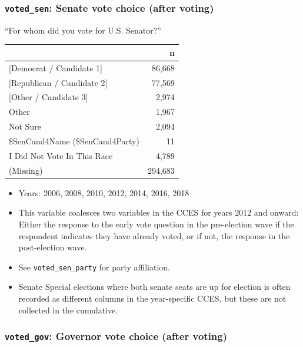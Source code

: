 \documentclass[10pt,article,oneside]{memoir}
\theoremstyle{definition}
\begin{document}
\hypertarget{voted_sen-senate-vote-choice-after-voting}{%
\subsubsection{\texorpdfstring{\texttt{voted\_sen}: Senate vote choice
(after
voting)}{voted\_sen: Senate vote choice (after voting)}}\label{voted_sen-senate-vote-choice-after-voting}}

``For whom did you vote for U.S. Senator?''

\begin{table}[H]
\centering
\begin{tabular}{lr}
\toprule
 & n\\
\midrule
{[Democrat / Candidate 1]} & 86,668\\
{[Republican / Candidate 2]} & 77,569\\
{[Other / Candidate 3]} & 2,974\\
Other & 1,967\\
Not Sure & 2,094\\
\$SenCand4Name (\$SenCand4Party) & 11\\
I Did Not Vote In This Race & 4,789\\
(Missing) & 294,683\\
\bottomrule
\end{tabular}
\end{table}

\begin{itemize}
\tightlist
\item
  Years: 2006, 2008, 2010, 2012, 2014, 2016, 2018
\item
  This variable coalesces two variables in the CCES for years 2012 and
  onward: Either the response to the early vote question in the
  pre-election wave if the respondent indicates they have already voted,
  or if not, the response in the post-election wave.
\item
  See \texttt{voted\_sen\_party} for party affiliation.
\item
  Senate Special elections where both senate seats are up for election
  is often recorded as different columns in the year-specific CCES, but
  these are not collected in the cumulative.
\end{itemize}

\hypertarget{voted_gov-governor-vote-choice-after-voting}{%
\subsubsection{\texorpdfstring{\texttt{voted\_gov}: Governor vote choice
(after
voting)}{voted\_gov: Governor vote choice (after voting)}}\label{voted_gov-governor-vote-choice-after-voting}}
\end{document}
